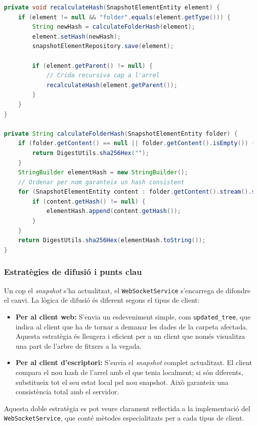 \begin{lstlisting}[language=Java, caption={Recàlcul recursiu de hashes a `SnapshotService`}]
private void recalculateHash(SnapshotElementEntity element) {
    if (element != null && "folder".equals(element.getType())) {
        String newHash = calculateFolderHash(element);
        element.setHash(newHash);
        snapshotElementRepository.save(element);
        
        if (element.getParent() != null) {
            // Crida recursiva cap a l'arrel
            recalculateHash(element.getParent());
        }
    }
}

private String calculateFolderHash(SnapshotElementEntity folder) {
    if (folder.getContent() == null || folder.getContent().isEmpty()) {
        return DigestUtils.sha256Hex("");
    }
    StringBuilder elementHash = new StringBuilder();
    // Ordenar per nom garanteix un hash consistent
    for (SnapshotElementEntity content : folder.getContent().stream().sorted(Comparator.comparing(SnapshotElementEntity::getName)).toList()) {
        if (content.getHash() != null) {
            elementHash.append(content.getHash());
        }
    }
    return DigestUtils.sha256Hex(elementHash.toString());
}
\end{lstlisting}

\subsubsection{Estratègies de difusió i punts clau}

Un cop el \textit{snapshot} s'ha actualitzat, el \texttt{WebSocketService} s'encarrega de difondre el canvi. La lògica de difusió és diferent segons el tipus de client:
\begin{itemize}
    \item \textbf{Per al client web:} S'envia un esdeveniment simple, com \texttt{updated\_tree}, que indica al client que ha de tornar a demanar les dades de la carpeta afectada. Aquesta estratègia és lleugera i eficient per a un client que només visualitza una part de l'arbre de fitxers a la vegada.
    \item \textbf{Per al client d'escriptori:} S'envia el \textit{snapshot} complet actualitzat. El client compara el nou hash de l'arrel amb el que tenia localment; si són diferents, substitueix tot el seu estat local pel nou snapshot. Això garanteix una consistència total amb el servidor.
\end{itemize}

Aquesta doble estratègia es pot veure clarament reflectida a la implementació del \texttt{WebSocketService}, que conté mètodes especialitzats per a cada tipus de client.

